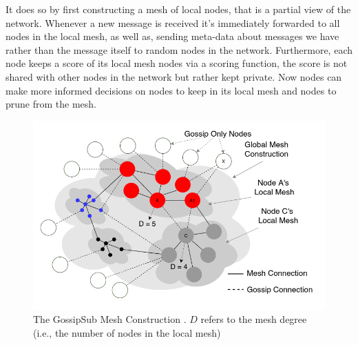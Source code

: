 \documentclass[12pt,twocolumn]{article}
\begin{document}
It does so by first constructing a mesh of local nodes, that is a partial view of the network. Whenever a new message is received it's immediately
forwarded to all nodes in the local mesh, as well as, sending meta-data about messages we have rather than the message itself to random nodes in
the network. Furthermore, each node keeps a score of its local mesh nodes via a scoring function, the score is not shared with other nodes in the network but rather
kept private. Now nodes can make more informed decisions on nodes to keep in its local mesh and nodes to prune from the mesh.
\begin{figure}[h]
    \includegraphics[width=\linewidth]{fig/gossip_sub.png}
    \caption{The GossipSub Mesh Construction \cite{gossip_sub}. $D$ refers 
    to the mesh degree (i.e., the number of nodes in the local mesh)
    }
\end{figure}
\end{document}
